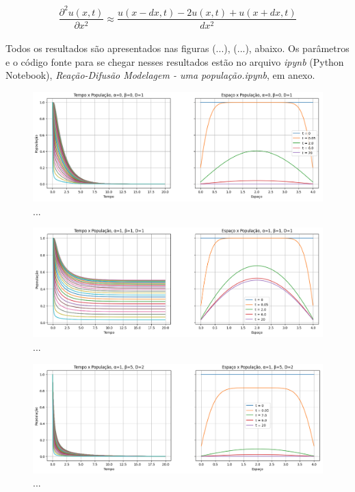 \documentclass{article}
\begin{document}
	 $$ \frac{\partial^2 u(x,t)}{\partial x^2} \approx \frac{u(x-dx,t) - 2u(x,t) + u(x+dx,t)}{dx^2}$$
	 
	 \paragraph{}
	 Todos os resultados são apresentados nas figuras (...), (...), abaixo. Os parâmetros e o código fonte para se chegar nesses resultados estão no arquivo \textit{ipynb} (Python Notebook), \textit{Reação-Difusão Modelagem - uma população.ipynb}, em anexo.
	 
	 \begin{figure}[h]
	 	\centering
	 	\includegraphics[scale=0.35]{L4-alpha0-beta0-D1}
	 	\caption{...}
	 	\label{fig:L4-alpha0-beta0-D1}
	 \end{figure}
 
 	\begin{figure}[h]
 		\centering
 		\includegraphics[scale=0.35]{L4-alpha1-beta1-D1}
 		\caption{...}
 		\label{fig:L4-alpha1-beta1-D1}
 	\end{figure}
 	
 	\begin{figure}[h]
 		\centering
 		\includegraphics[scale=0.35]{L4-alpha1-beta5-D2}
 		\caption{...}
 		\label{fig:L4-alpha1-beta5-D2}
 	\end{figure}
 
\end{document}
